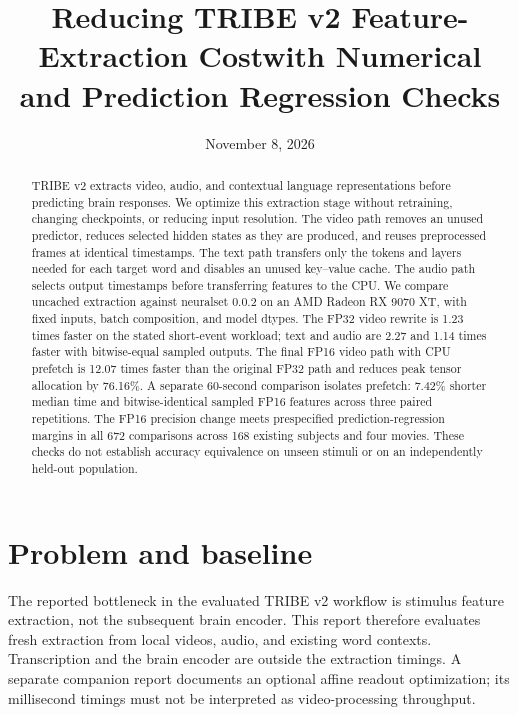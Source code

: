 \documentclass[10pt]{article}
\title{Reducing TRIBE v2 Feature-Extraction Cost\newline with Numerical and Prediction Regression Checks}
\author{}
\date{November 8, 2026}
\begin{document}
\maketitle
\begin{abstract}
TRIBE v2 extracts video, audio, and contextual language representations before
predicting brain responses. We optimize this extraction stage without retraining,
changing checkpoints, or reducing input resolution. The video path removes an
unused predictor, reduces selected hidden states as they are produced, and
reuses preprocessed frames at identical timestamps. The text path transfers only the
tokens and layers needed for each target word and disables an unused key--value
cache. The audio path selects output timestamps before transferring features
to the CPU. We compare uncached extraction against neuralset 0.0.2 on an AMD
Radeon RX 9070 XT, with fixed inputs, batch composition, and model dtypes.
The FP32 video rewrite is 1.23 times faster on the stated short-event workload;
text and audio are 2.27 and 1.14 times faster with bitwise-equal sampled outputs.
The final FP16 video path with CPU prefetch is 12.07 times faster than the
original FP32 path and reduces peak tensor allocation by 76.16\%. A separate
60-second comparison isolates prefetch: 7.42\% shorter median time and
bitwise-identical sampled FP16 features across three paired repetitions. The
FP16 precision change meets prespecified prediction-regression margins in all
672 comparisons across 168 existing subjects and four movies. These checks do not establish accuracy equivalence on unseen stimuli
or on an independently held-out population.
\end{abstract}

\section{Problem and baseline}
The reported bottleneck in the evaluated TRIBE v2 workflow is stimulus feature extraction,
not the subsequent brain encoder. This report therefore evaluates fresh extraction
from local videos, audio, and existing word contexts. Transcription and the brain
encoder are outside the extraction timings. A separate companion report documents
an optional affine readout optimization; its millisecond timings must not be
interpreted as video-processing throughput.
\end{document}
